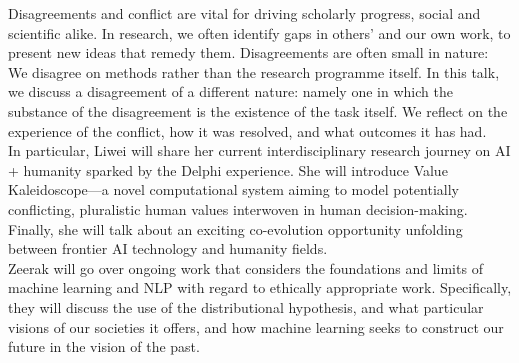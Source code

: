 Disagreements and conflict are vital for driving scholarly progress, social and scientific alike. In research, we often identify gaps in others' and our own work, to present new ideas that remedy them. Disagreements are often small in nature: We disagree on methods rather than the research programme itself. In this talk, we discuss a disagreement of a different nature: namely one in which the substance of the disagreement is the existence of the task itself. We reflect on the experience of the conflict, how it was resolved, and what outcomes it has had.
\\
In particular, Liwei will share her current interdisciplinary research journey on AI + humanity sparked by the Delphi experience. She will introduce Value Kaleidoscope—a novel computational system aiming to model potentially conflicting, pluralistic human values interwoven in human decision-making. Finally, she will talk about an exciting co-evolution opportunity unfolding between frontier AI technology and humanity fields.
\\
Zeerak will go over ongoing work that considers the foundations and limits of machine learning and NLP with regard to ethically appropriate work. Specifically, they will discuss the use of the distributional hypothesis, and what particular visions of our societies it offers, and how machine learning seeks to construct our future in the vision of the past.